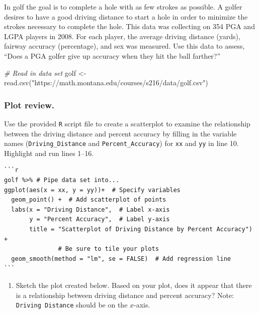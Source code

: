 \documentclass[
]{report}
\newenvironment{Shaded}{\begin{snugshade}}{\end{snugshade}}
\newcommand{\CommentTok}[1]{\textcolor[rgb]{0.56,0.35,0.01}{\textit{#1}}}
\newcommand{\FunctionTok}[1]{\textcolor[rgb]{0.00,0.00,0.00}{#1}}
\newcommand{\NormalTok}[1]{#1}
\newcommand{\OtherTok}[1]{\textcolor[rgb]{0.56,0.35,0.01}{#1}}
\newcommand{\StringTok}[1]{\textcolor[rgb]{0.31,0.60,0.02}{#1}}
\providecommand{\tightlist}{%
  \setlength{\itemsep}{0pt}\setlength{\parskip}{0pt}}
\begin{document}
In golf the goal is to complete a hole with as few strokes as possible. A golfer desires to have a good driving distance to start a hole in order to minimize the strokes necessary to complete the hole. This data was collecting on 354 PGA and LGPA players in 2008. For each player, the average driving distance (yards), fairway accuracy (percentage), and sex was measured. Use this data to assess, ``Does a PGA golfer give up accuracy when they hit the ball farther?''

\begin{Shaded}
\begin{Highlighting}[]
\CommentTok{\# Read in data set}
\NormalTok{golf }\OtherTok{\textless{}{-}} \FunctionTok{read.csv}\NormalTok{(}\StringTok{"https://math.montana.edu/courses/s216/data/golf.csv"}\NormalTok{)}
\end{Highlighting}
\end{Shaded}

\hypertarget{plot-review.}{%
\subsubsection*{Plot review.}\label{plot-review.}}

Use the provided \texttt{R} script file to create a scatterplot to examine the relationship between the driving distance and percent accuracy by filling in the variable names (\texttt{Driving\_Distance} and \texttt{Percent\_Accuracy}) for \texttt{xx} and \texttt{yy} in line 10. Highlight and run lines 1--16.

\begin{verbatim}
```r
golf %>% # Pipe data set into...
ggplot(aes(x = xx, y = yy))+  # Specify variables
  geom_point() +  # Add scatterplot of points
  labs(x = "Driving Distance",  # Label x-axis
       y = "Percent Accuracy",  # Label y-axis
       title = "Scatterplot of Driving Distance by Percent Accuracy") + 
               # Be sure to tile your plots
  geom_smooth(method = "lm", se = FALSE)  # Add regression line
```
\end{verbatim}

\begin{enumerate}
\def\labelenumi{\arabic{enumi}.}
\tightlist
\item
  Sketch the plot created below. Based on your plot, does it appear that there is a relationship between driving distance and percent accuracy? Note: \texttt{Driving\ Distance} should be on the \(x\)-axis.
\end{enumerate}
\end{document}
